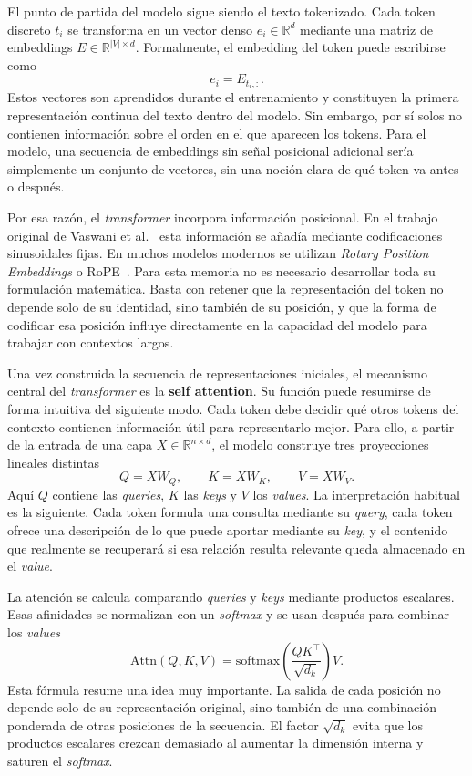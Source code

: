 El punto de partida del modelo sigue siendo el texto tokenizado. Cada token discreto $t_i$ se transforma en un vector denso $e_i \in \mathbb{R}^{d}$ mediante una matriz de embeddings $E \in \mathbb{R}^{|V|\times d}$. Formalmente, el embedding del token puede escribirse como
\[
e_i = E_{t_i,:}.
\]
Estos vectores son aprendidos durante el entrenamiento y constituyen la primera representación continua del texto dentro del modelo. Sin embargo, por sí solos no contienen información sobre el orden en el que aparecen los tokens. Para el modelo, una secuencia de embeddings sin señal posicional adicional sería simplemente un conjunto de vectores, sin una noción clara de qué token va antes o después.

Por esa razón, el \textit{transformer} incorpora información posicional. En el trabajo original de Vaswani et al.~\cite{vaswani2017attention} esta información se añadía mediante codificaciones sinusoidales fijas. En muchos modelos modernos se utilizan \textit{Rotary Position Embeddings} o RoPE~\cite{su2021roformer}. Para esta memoria no es necesario desarrollar toda su formulación matemática. Basta con retener que la representación del token no depende solo de su identidad, sino también de su posición, y que la forma de codificar esa posición influye directamente en la capacidad del modelo para trabajar con contextos largos.

Una vez construida la secuencia de representaciones iniciales, el mecanismo central del \textit{transformer} es la \textbf{self attention}. Su función puede resumirse de forma intuitiva del siguiente modo. Cada token debe decidir qué otros tokens del contexto contienen información útil para representarlo mejor. Para ello, a partir de la entrada de una capa $X \in \mathbb{R}^{n\times d}$, el modelo construye tres proyecciones lineales distintas
\[
Q = XW_Q,\qquad K = XW_K,\qquad V = XW_V.
\]
Aquí $Q$ contiene las \textit{queries}, $K$ las \textit{keys} y $V$ los \textit{values}. La interpretación habitual es la siguiente. Cada token formula una consulta mediante su \textit{query}, cada token ofrece una descripción de lo que puede aportar mediante su \textit{key}, y el contenido que realmente se recuperará si esa relación resulta relevante queda almacenado en el \textit{value}.

La atención se calcula comparando \textit{queries} y \textit{keys} mediante productos escalares. Esas afinidades se normalizan con un \textit{softmax} y se usan después para combinar los \textit{values}
\[
\mathrm{Attn}(Q,K,V)=\mathrm{softmax}\!\left(\frac{QK^\top}{\sqrt{d_k}}\right)V.
\]
Esta fórmula resume una idea muy importante. La salida de cada posición no depende solo de su representación original, sino también de una combinación ponderada de otras posiciones de la secuencia. El factor $\sqrt{d_k}$ evita que los productos escalares crezcan demasiado al aumentar la dimensión interna y saturen el \textit{softmax}.

